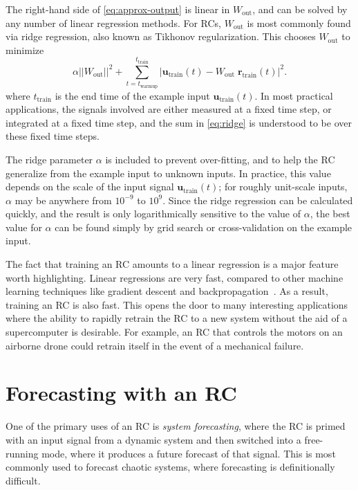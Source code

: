The right-hand side of \cref{eq:approx-output} is linear in
$W_\text{out}$, and can be solved by any number of linear regression
methods. For RCs, $W_\text{out}$ is most commonly found via ridge
regression, also known as Tikhonov regularization. This chooses
$W_\text{out}$ to minimize
\begin{equation}
  \label{eq:ridge}
  \alpha ||W_\text{out}||^2 + \sum_{t = t_\text{warmup}}^{t_\text{train}} |\mathbf{u}_\text{train}(t) - W_\text{out}\;\mathbf{r}_\text{train}(t)|^2.
\end{equation}
where $t_\text{train}$ is the end time of the example input $\bm{u}_\text{train}(t)$.
In most practical applications, the signals involved are either
measured at a fixed time step, or integrated at a fixed time step, and
the sum in \cref{eq:ridge} is understood to be over these fixed time
steps.

The ridge parameter $\alpha$ is included to prevent over-fitting, and
to help the RC generalize from the example input to unknown inputs. In
practice, this value depends on the scale of the input signal
$\bm{u}_\text{train}(t)$; for roughly unit-scale inputs, $\alpha$ may be
anywhere from $10^{-9}$ to $10^9$. Since the ridge regression can be
calculated quickly, and the result is only logarithmically sensitive
to the value of $\alpha$, the best value for $\alpha$ can be found
simply by grid search or cross-validation on the example input.

The fact that training an RC amounts to a linear regression is a major
feature worth highlighting. Linear regressions are very fast, compared
to other machine learning techniques like gradient descent and
backpropagation~\cite{lukosevicius2009}. As a result, training an RC
is also fast. This opens the door to many interesting applications
where the ability to rapidly retrain the RC to a new system without the aid of
a supercomputer is desirable. For example, an RC that controls the
motors on an airborne drone could retrain itself in the event of a
mechanical failure.

\section{Forecasting with an RC}\label{sec:forecasting}

One of the primary uses of an RC is \emph{system forecasting}, where
the RC is primed with an input signal from a dynamic system and then
switched into a free-running mode, where it produces a future forecast
of that signal. This is most commonly used to forecast
chaotic systems, where forecasting is definitionally difficult.

